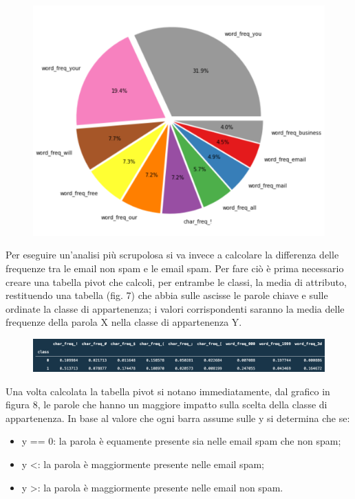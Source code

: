 \documentclass[12pt,a4paper]{article}
\begin{document}
\begin{figure}[H]
    \centering
    \includegraphics[width=.7\linewidth]{top_10_only_spam.png}
    \caption{}
\end{figure}
Per eseguire un'analisi più scrupolosa si va invece a calcolare la differenza delle frequenze tra le email non spam e le email spam. 
Per fare ciò è prima necessario creare una tabella pivot che calcoli, per entrambe le classi, la media di attributo, restituendo una tabella (fig. 7) che abbia sulle ascisse le parole chiave e sulle ordinate la classe di appartenenza; i valori corrispondenti saranno la media delle frequenze della parola X nella classe di appartenenza Y.
\begin{figure}[H]
    \includegraphics[width=1\linewidth]{pivot.png}
    \caption{}
\end{figure}
Una volta calcolata la tabella pivot si notano immediatamente, dal grafico in figura 8, le parole che hanno un maggiore impatto sulla scelta della classe di appartenenza. In base al valore che ogni barra assume sulle y si determina che se:
\begin{itemize}
    \item y == 0: la parola è equamente presente sia nelle email spam che non spam;
    \item y \textless  {}: la parola è maggiormente presente nelle email spam;
    \item y \textgreater {}: la parola è maggiormente presente nelle email non spam.
\end{itemize}
\end{document}
